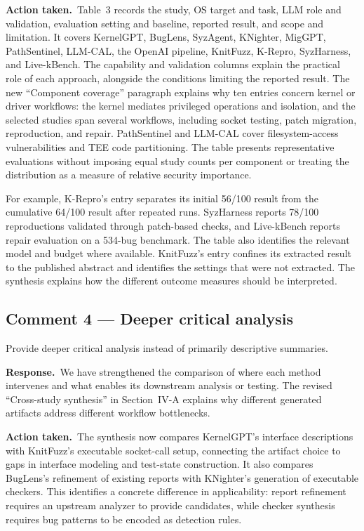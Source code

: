 \documentclass[11pt,a4paper]{article}
\newcommand{\response}{\par\textbf{Response.}\ }
\newcommand{\action}{\par\textbf{Action taken.}\ }
\begin{document}
\action Table~3 records the study, OS target and task, LLM role and validation, evaluation setting and baseline, reported result, and scope and limitation. It covers KernelGPT, BugLens, SyzAgent, KNighter, MigGPT, PathSentinel, LLM-CAL, the OpenAI pipeline, KnitFuzz, K-Repro, SyzHarness, and Live-kBench. The capability and validation columns explain the practical role of each approach, alongside the conditions limiting the reported result. The new ``Component coverage'' paragraph explains why ten entries concern kernel or driver workflows: the kernel mediates privileged operations and isolation, and the selected studies span several workflows, including socket testing, patch migration, reproduction, and repair. PathSentinel and LLM-CAL cover filesystem-access vulnerabilities and TEE code partitioning. The table presents representative evaluations without imposing equal study counts per component or treating the distribution as a measure of relative security importance.

For example, K-Repro's entry separates its initial 56/100 result from the cumulative 64/100 result after repeated runs. SyzHarness reports 78/100 reproductions validated through patch-based checks, and Live-kBench reports repair evaluation on a 534-bug benchmark. The table also identifies the relevant model and budget where available. KnitFuzz's entry confines its extracted result to the published abstract and identifies the settings that were not extracted. The synthesis explains how the different outcome measures should be interpreted.

\subsection{Comment 4 --- Deeper critical analysis}
\begin{reviewcomment}
Provide deeper critical analysis instead of primarily descriptive summaries.
\end{reviewcomment}

\response We have strengthened the comparison of where each method intervenes and what enables its downstream analysis or testing. The revised ``Cross-study synthesis'' in Section~IV-A explains why different generated artifacts address different workflow bottlenecks.

\action The synthesis now compares KernelGPT's interface descriptions with KnitFuzz's executable socket-call setup, connecting the artifact choice to gaps in interface modeling and test-state construction. It also compares BugLens's refinement of existing reports with KNighter's generation of executable checkers. This identifies a concrete difference in applicability: report refinement requires an upstream analyzer to provide candidates, while checker synthesis requires bug patterns to be encoded as detection rules.
\end{document}
